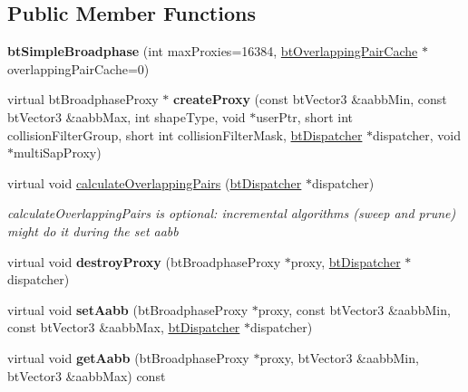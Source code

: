 \subsection*{Public Member Functions}
\begin{DoxyCompactItemize}
\item 
\mbox{\label{classbtSimpleBroadphase_ab9fe91cf132bed4e0e36073fc25e0e20}} 
{\bfseries bt\+Simple\+Broadphase} (int max\+Proxies=16384, \hyperlink{classbtOverlappingPairCache}{bt\+Overlapping\+Pair\+Cache} $\ast$overlapping\+Pair\+Cache=0)
\item 
\mbox{\label{classbtSimpleBroadphase_a5d4d2bb48a191b5c62050582f1ed1e6b}} 
virtual bt\+Broadphase\+Proxy $\ast$ {\bfseries create\+Proxy} (const bt\+Vector3 \&aabb\+Min, const bt\+Vector3 \&aabb\+Max, int shape\+Type, void $\ast$user\+Ptr, short int collision\+Filter\+Group, short int collision\+Filter\+Mask, \hyperlink{classbtDispatcher}{bt\+Dispatcher} $\ast$dispatcher, void $\ast$multi\+Sap\+Proxy)
\item 
virtual void \hyperlink{classbtSimpleBroadphase_ac899d483e888fa132677125c88991de8}{calculate\+Overlapping\+Pairs} (\hyperlink{classbtDispatcher}{bt\+Dispatcher} $\ast$dispatcher)
\begin{DoxyCompactList}\small\item\em calculate\+Overlapping\+Pairs is optional\+: incremental algorithms (sweep and prune) might do it during the set aabb \end{DoxyCompactList}\item 
\mbox{\label{classbtSimpleBroadphase_ac49ea7e0bd660d5541001ad7765d0e41}} 
virtual void {\bfseries destroy\+Proxy} (bt\+Broadphase\+Proxy $\ast$proxy, \hyperlink{classbtDispatcher}{bt\+Dispatcher} $\ast$dispatcher)
\item 
\mbox{\label{classbtSimpleBroadphase_a66c0d10165376dd63cb4b498253caa9a}} 
virtual void {\bfseries set\+Aabb} (bt\+Broadphase\+Proxy $\ast$proxy, const bt\+Vector3 \&aabb\+Min, const bt\+Vector3 \&aabb\+Max, \hyperlink{classbtDispatcher}{bt\+Dispatcher} $\ast$dispatcher)
\item 
\mbox{\label{classbtSimpleBroadphase_abfd9134f1e8b8a695038fca7b9a81843}} 
virtual void {\bfseries get\+Aabb} (bt\+Broadphase\+Proxy $\ast$proxy, bt\+Vector3 \&aabb\+Min, bt\+Vector3 \&aabb\+Max) const

\end{DoxyCompactItemize}

